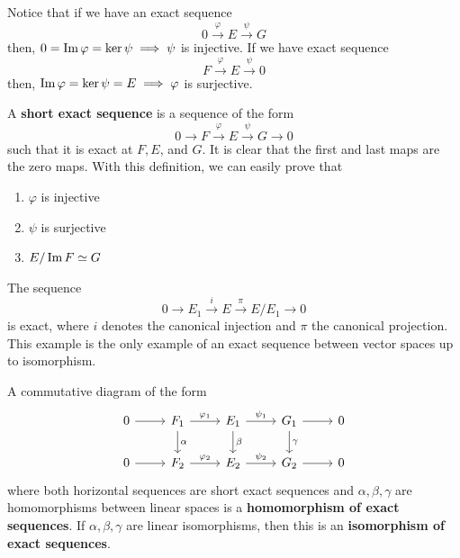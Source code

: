   Notice that if we have an exact sequence 
  \begin{equation}
    0 \xrightarrow{\varphi} E \xrightarrow{\psi} G
  \end{equation}
  then, $0 = \im{\varphi} = \ker{\psi} \implies \psi$ is injective. If we have exact sequence 
  \begin{equation}
    F \xrightarrow{\varphi} E \xrightarrow{\psi} 0
  \end{equation}
  then, $\im{\varphi} = \ker{\psi} = E \implies \varphi$ is surjective. 

  \begin{definition}
    A \textbf{short exact sequence} is a sequence of the form
    \begin{equation}
      0 \xrightarrow{} F \xrightarrow{\varphi} E \xrightarrow{\psi} G \xrightarrow{} 0
    \end{equation}
    such that it is exact at $F, E$, and $G$. It is clear that the first and last maps are the zero maps. With this definition, we can easily prove that
    \begin{enumerate}
      \item $\varphi$ is injective
      \item $\psi$ is surjective
      \item $E / \im{F} \simeq G$
    \end{enumerate}
  \end{definition}

  \begin{example}
    The sequence 
    \begin{equation}
      0 \xrightarrow{} E_1 \xrightarrow{i} E \xrightarrow{\pi} E / E_1 \xrightarrow{} 0
    \end{equation}
    is exact, where $i$ denotes the canonical injection and $\pi$ the canonical projection. This example is the only example of an exact sequence between vector spaces up to isomorphism. 
  \end{example}

  \begin{definition}
    A commutative diagram of the form
    \[\begin{tikzcd}
        0 \arrow{r} & F_1 \arrow{d}{\alpha} \arrow{r}{\varphi_1} & E_1 \arrow{d}{\beta} \arrow{r}{\psi_1} & G_1 \arrow{d}{\gamma} \arrow{r} & 0 \\
        0 \arrow{r} & F_2 \arrow{r}{\varphi_2} & E_2 \arrow{r}{\psi_2} & G_2 \arrow{r} & 0 
    \end{tikzcd}\]
    where both horizontal sequences are short exact sequences and $\alpha, \beta, \gamma$ are homomorphisms between linear spaces is a \textbf{homomorphism of exact sequences}. If $\alpha, \beta, \gamma$ are linear isomorphisms, then this is an \textbf{isomorphism of exact sequences}. 
  \end{definition}

